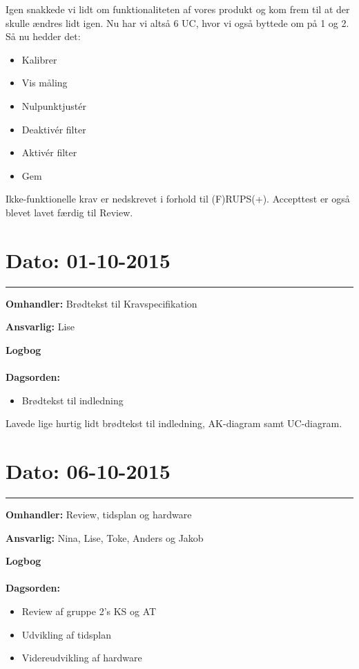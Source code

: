 Igen snakkede vi lidt om funktionaliteten af vores produkt og kom frem til at der skulle ændres lidt igen. Nu har vi altså 6 UC, hvor vi også byttede om på 1 og 2. Så nu hedder det: 
\begin{itemize}
	\item Kalibrer
	\item Vis måling 
	\item Nulpunktjustér 
	\item Deaktivér filter 
	\item Aktivér filter
	\item Gem 
\end{itemize}

Ikke-funktionelle krav er nedskrevet i forhold til (F)RUPS(+). Accepttest er også blevet lavet færdig til Review. 

	
	

\section{Dato: 01-10-2015 }
\hrule

\textbf{Omhandler:} Brødtekst til Kravspecifikation 

\textbf{Ansvarlig:} Lise 

\textbf{Logbog}
\\
\\
\textbf{Dagsorden:}
\begin{itemize}
	\item Brødtekst til indledning
\end{itemize}

Lavede lige hurtig lidt brødtekst til indledning, AK-diagram samt UC-diagram. 




\section{Dato: 06-10-2015 }
\hrule

\textbf{Omhandler:} Review, tidsplan og hardware  

\textbf{Ansvarlig:} Nina, Lise, Toke, Anders og Jakob

\textbf{Logbog}
\\
\\
\textbf{Dagsorden:}
\begin{itemize}
	\item Review af gruppe 2's KS og AT
	\item Udvikling af tidsplan
	\item Videreudvikling af hardware
\end{itemize}

